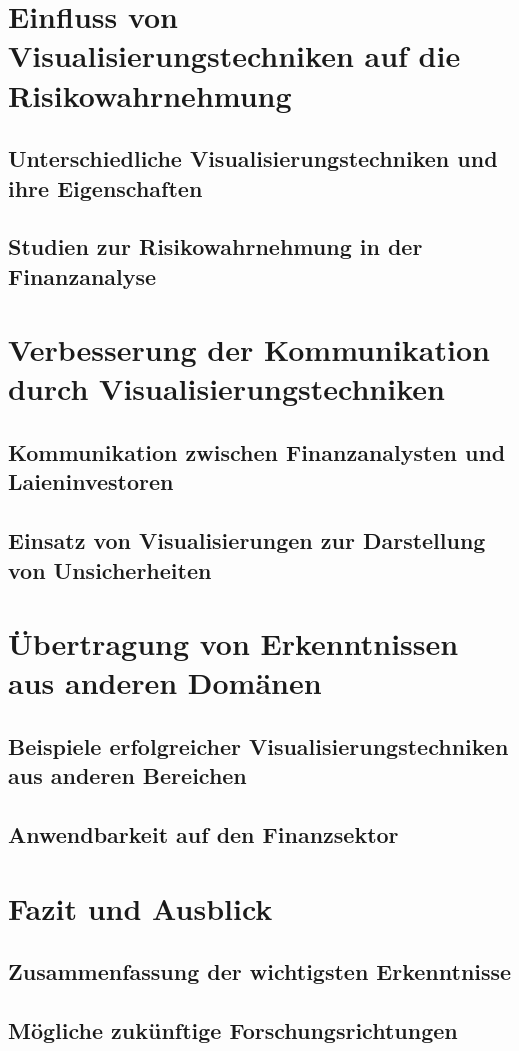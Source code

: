 \section{Einfluss von Visualisierungstechniken auf die Risikowahrnehmung}
\subsection{Unterschiedliche Visualisierungstechniken und ihre Eigenschaften}
\cite{Pang1997}
\cite{Kerr2023}
\cite{Brodlie2012ARO}
\cite{Haber1990}
\subsection{Studien zur Risikowahrnehmung in der Finanzanalyse}

\section{Verbesserung der Kommunikation durch Visualisierungstechniken}
\subsection{Kommunikation zwischen Finanzanalysten und Laieninvestoren}
\cite{Joslyn2021}
\subsection{Einsatz von Visualisierungen zur Darstellung von Unsicherheiten}

\section{Übertragung von Erkenntnissen aus anderen Domänen}
\subsection{Beispiele erfolgreicher Visualisierungstechniken aus anderen Bereichen}
\cite{Boller2010}
\subsection{Anwendbarkeit auf den Finanzsektor}

\section{Fazit und Ausblick}
\subsection{Zusammenfassung der wichtigsten Erkenntnisse}
\subsection{Mögliche zukünftige Forschungsrichtungen}

